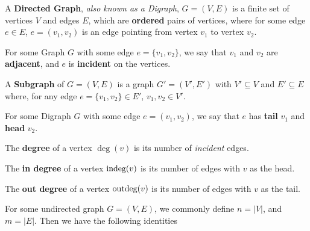 \documentclass[12pt]{article}
\begin{document}


   {
    A {\bf Directed Graph}, {\it also known as a Digraph}, $G = (V, E)$ is a
    finite set of vertices $V$ and edges $E$, which are {\bf ordered} pairs of
    vertices, where for some edge $e \in E$, $e = (v_1, v_2)$ is an edge pointing
    from vertex $v_1$ to vertex $v_2$.
  }


   {
    For some Graph $G$ with some edge $e = \{v_1, v_2\}$, we say that $v_1$ and
    $v_2$ are {\bf adjacent}, and $e$ is {\bf incident} on the vertices.
  }

   {
    A {\bf Subgraph} of $G = (V, E)$ is a graph $G' = (V', E')$ with $V' \subseteq
    V$ and $E' \subseteq E$ where, for any edge $e = \{v_1, v_2\} \in E'$, $v_1, v_2
    \in V'$.

  }

   {
    For some Digraph $G$ with some edge $e = (v_1, v_2)$, we say that $e$ has
    {\bf tail} $v_1$ and {\bf head} $v_2$.
  }

   {
      The {\bf degree} of a vertex $\deg(v)$ is its number of {\it incident}
      edges.

      \bigskip

      The {\bf in degree} of a vertex $\text{indeg}(v)$ is its number of edges with
      $v$ as the head.


      \bigskip

      The {\bf out degree} of a vertex $\text{outdeg}(v)$ is its number of edges with
      $v$ as the tail.

  }

  For some undirected graph $G = (V, E)$, we commonly define $n = |V|$, and $m =
  |E|$. Then we have the following identities
\end{document}
